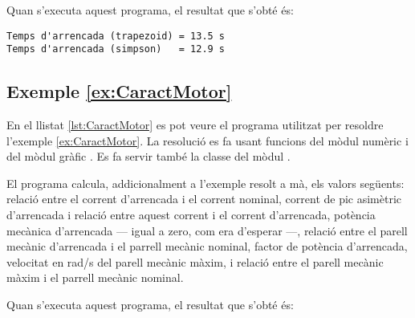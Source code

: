 Quan s'executa aquest programa, el resultat que s'obté és:
\lstset{
	language=,
	numbers=none,
	frame=none
}
\begin{lstlisting}
Temps d'arrencada (trapezoid) = 13.5 s
Temps d'arrencada (simpson)   = 12.9 s
\end{lstlisting} 


\hypertarget{exemple:CaractMotor}{\subsection{Exemple \ref*{ex:CaractMotor} \CaractMotor}}
En el llistat \vref{lst:CaractMotor} es pot veure el programa utilitzat per resoldre l'exemple \vref{ex:CaractMotor}. La resolució es fa usant funcions del mòdul numèric  i del mòdul gràfic . Es fa servir també la classe  del mòdul .


El programa calcula, addicionalment a l'exemple resolt a mà, els valors següents: relació entre el corrent d'arrencada i el corrent nominal, corrent de pic asimètric d'arrencada i relació entre aquest corrent i el corrent d'arrencada, potència mecànica d'arrencada --- igual a zero, com era d'esperar ---, relació entre el parell mecànic d'arrencada i el parrell mecànic nominal, factor de potència d'arrencada, velocitat en rad/s del parell mecànic màxim, i relació entre el parell mecànic màxim i el parrell mecànic nominal.

Quan s'executa aquest programa, el resultat que s'obté és:
\lstset{
	language=,
	numbers=none,
	frame=none
}

